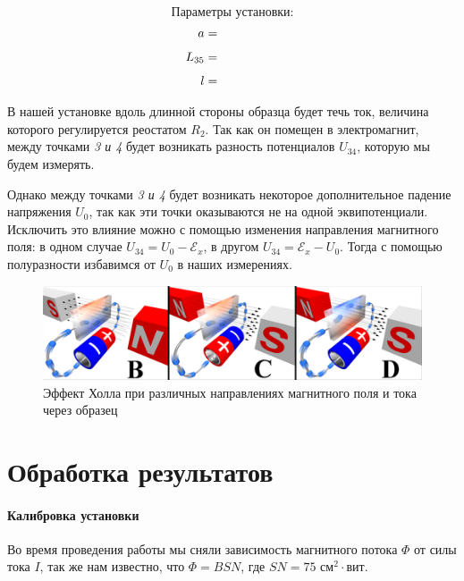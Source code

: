 \documentclass{physlab}
\begin{document}
$$\text{Параметры установки:}$$
\begin{align*}
a &= \val \\[1ex]
L_{35} &= \val \\[1ex]
l &= \val
\end{align*}
\vspace{5.7 cm}

В нашей установке вдоль длинной стороны образца будет течь ток, величина которого регулируется реостатом $R_2$. Так как он помещен в электромагнит, между точками \textit{3 и 4} будет возникать разность потенциалов $U_{34}$, которую мы будем измерять. 

Однако между точками \textit{3 и 4} будет возникать некоторое дополнительное падение напряжения $U_{0}$, так как эти точки оказываются не на одной эквипотенциали. Исключить это влияние можно с помощью изменения направления магнитного поля: в одном случае $U_{34} = U_{0} - \mathscr{E}_x $, в другом  $U_{34} = \mathscr{E}_x - U_0$. Тогда с помощью полуразности избавимся от $U_{0}$ в наших измерениях. 

\begin{figure}[H]
	\begin{center}
		\includegraphics[width = 0.6 \textwidth]{hall_dif}
		\caption{Эффект Холла при различных направлениях магнитного поля и тока через образец}
	\end{center}
\end{figure}


\section{Обработка результатов}

\paragraph{Калибровка установки}
Во время проведения работы мы сняли зависимость магнитного потока $\varPhi$ от силы тока $I$, так же нам известно, что $\varPhi=BSN$, где $SN=75\text{ см}^2\cdot\text{вит}$.

\begin{table}[H]
\centering
\caption{Данные для калибровки установки}
\label{calibrate}
\end{table}
\end{document}

